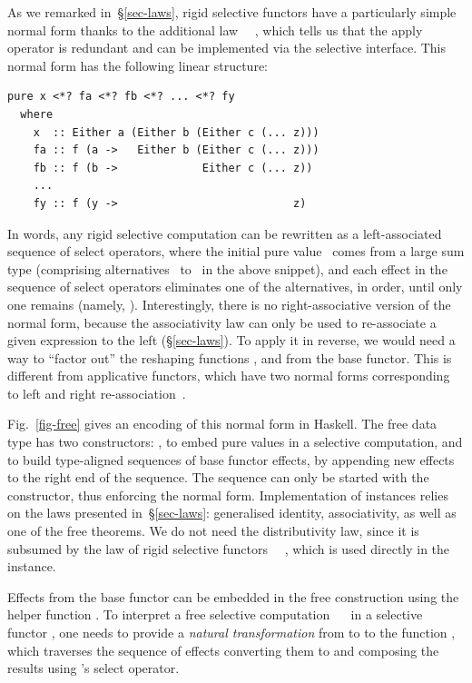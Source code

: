 As we remarked in~\S\ref{sec-laws}, rigid selective functors have a particularly
simple normal form thanks to the additional law \hs{(<*>)}~\hs{=}~,
which tells us that the apply operator \hs{<*>} is redundant and can be
implemented via the selective interface. This normal form has the following
linear structure:

\begin{verbatim}
pure x <*? fa <*? fb <*? ... <*? fy
  where
    x  :: Either a (Either b (Either c (... z)))
    fa :: f (a ->   Either b (Either c (... z)))
    fb :: f (b ->             Either c (... z))
    ...
    fy :: f (y ->                           z)
\end{verbatim}

\noindent
In words, any rigid selective computation can be rewritten as a left-associated
sequence of select operators, where the initial pure value~ comes from a
large sum type (comprising alternatives~ to~ in the above snippet),
and each effect in the sequence of select operators eliminates one of the
alternatives, in order, until only one remains (namely, ). Interestingly,
there is no right-associative version of the normal form, because the
associativity law can only be used to re-associate a given expression to the
left (\S\ref{sec-laws}). To apply it in reverse, we would need a way to
``factor out'' the reshaping functions ,  and  from the base
functor. This is different from applicative functors, which have two normal
forms corresponding to left and right re-association~\citep{free-applicatives}.

Fig.~\ref{fig-free} gives an encoding of this normal form in Haskell. The free
data type  has two constructors: , to embed pure values in
a selective computation, and  to build type-aligned sequences of
base functor effects, by appending new effects to the right end of the sequence.
The sequence can only be started with the  constructor, thus enforcing
the normal form. Implementation of instances relies on the laws presented
in~\S\ref{sec-laws}: generalised identity, associativity, as well as one of the
free theorems. We do not need the distributivity law, since it is subsumed by
the law of rigid selective functors \hs{(<*>)}~\hs{=}~, which is used
directly in the  instance.

Effects from the base functor can be embedded in the free construction using
the helper function . To interpret a free selective computation
~~ in a selective functor , one needs to provide
a \emph{natural transformation} from  to  to the function
, which traverses the sequence of effects converting them to
 and composing the results using 's select operator.

